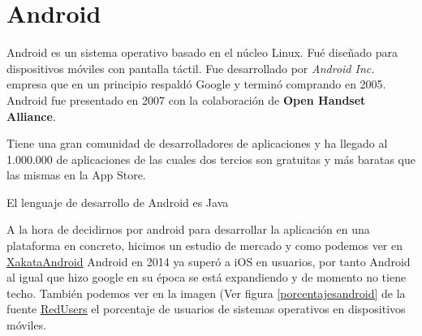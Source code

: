 %
%
%
%
%

\chapter{Android}
Android es un sistema operativo basado en el núcleo Linux. Fué diseñado para dispositivos móviles con pantalla táctil. Fue desarrollado por \textit{Android Inc.} empresa que en un principio respaldó Google y terminó comprando  en 2005. Android fue presentado en 2007 con la colaboración de \textbf{Open Handset Alliance}.

Tiene una gran comunidad de desarrolladores de aplicaciones y ha llegado al 1.000.000 de aplicaciones de las cuales dos tercios son gratuitas y más baratas que las mismas en la App Store.

El lenguaje de desarrollo de Android es Java

A la hora de decidirnos por android para desarrollar la aplicación en una plataforma en concreto, hicimos un estudio de mercado y como podemos ver en \href{http://www.xatakandroid.com/mercado/android-se-convierte-en-el-sistema-operativo-movil-mas-usado-de-estados-unidos}{XakataAndroid} Android en 2014 ya superó a iOS en usuarios, por tanto Android al igual que hizo google en su época se está expandiendo y de momento no tiene techo. También podemos ver en la imagen (Ver figura \ref{porcentajesandroid} de la fuente \href{http://www.redusers.com/noticias/navegacion-movil-los-usuarios-de-ios-son-7-veces-mas-activos-que-los-de-android/}{RedUsers} el porcentaje de usuarios de sistemas operativos en dispositivos móviles.


